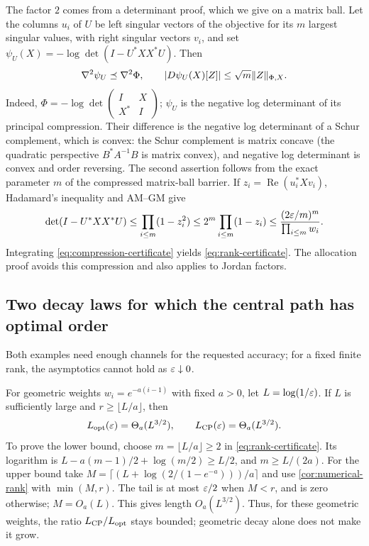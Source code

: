 The factor $2$ comes from a determinant proof, which we give on a
matrix ball. Let the columns $u_i$ of $U$ be left singular vectors of
the objective for its $m$ largest singular values, with right singular
vectors $v_i$, and set
$\psi_U(X)=-\log\det(I-U^*XX^*U)$. Then
\begin{equation}
 \nabla^2\psi_U\preceq\nabla^2\Phi,
 \qquad |D\psi_U(X)[Z]|\leq\sqrt m\lVert Z\rVert_{\Phi,X}.
 \label{eq:compression-certificate}
\end{equation}
Indeed, $\Phi=-\log\det\left(\begin{smallmatrix}I&X\\X^*&I\end{smallmatrix}\right)$;
$\psi_U$ is the negative log determinant of its principal compression.
Their difference is the negative log determinant of a Schur complement,
which is convex: the Schur complement is matrix concave (the quadratic
perspective $B^*A^{-1}B$ is matrix convex), and negative log determinant
is convex and order reversing. The second assertion follows from the
exact parameter $m$ of the compressed matrix-ball barrier. If
$z_i=\operatorname{Re}(u_i^*Xv_i)$, Hadamard's inequality and AM--GM
give
\[
 \det(I-U^*XX^*U)\leq\prod_{i\leq m}(1-z_i^2)
 \leq2^m\prod_{i\leq m}(1-z_i)
 \leq\frac{(2\varepsilon/m)^m}{\prod_{i\leq m}w_i}.
\]
Integrating \eqref{eq:compression-certificate} yields
\eqref{eq:rank-certificate}. The allocation proof avoids this
compression and also applies to Jordan factors.

\subsection{Two decay laws for which the central path has optimal order}
Both examples need enough channels for the requested accuracy; for a
fixed finite rank, the asymptotics cannot hold as $\varepsilon\downarrow0$.

For geometric weights $w_i=e^{-a(i-1)}$ with fixed $a>0$, let
$L=\log(1/\varepsilon)$. If $L$ is sufficiently large and
$r\geq\lfloor L/a\rfloor$, then
\begin{equation}
 L_{\mathrm{opt}}(\varepsilon)=\Theta_a(L^{3/2}),\qquad
 L_{\mathrm{CP}}(\varepsilon)=\Theta_a(L^{3/2}).
 \label{eq:geometric-decay}
\end{equation}
To prove the lower bound, choose $m=\lfloor L/a\rfloor\geq2$ in
\eqref{eq:rank-certificate}. Its logarithm is
$L-a(m-1)/2+\log(m/2)\geq L/2$, and $m\geq L/(2a)$.
For the upper bound take
$M=\lceil(L+\log(2/(1-e^{-a})))/a\rceil$ and use
\cref{cor:numerical-rank} with $\min(M,r)$. The tail is at most
$\varepsilon/2$ when $M<r$, and is zero otherwise; $M=O_a(L)$.
This gives length $O_a(L^{3/2})$. Thus, for these geometric weights,
the ratio $L_{\mathrm{CP}}/L_{\mathrm{opt}}$ stays bounded; geometric decay alone does not
make it grow.

